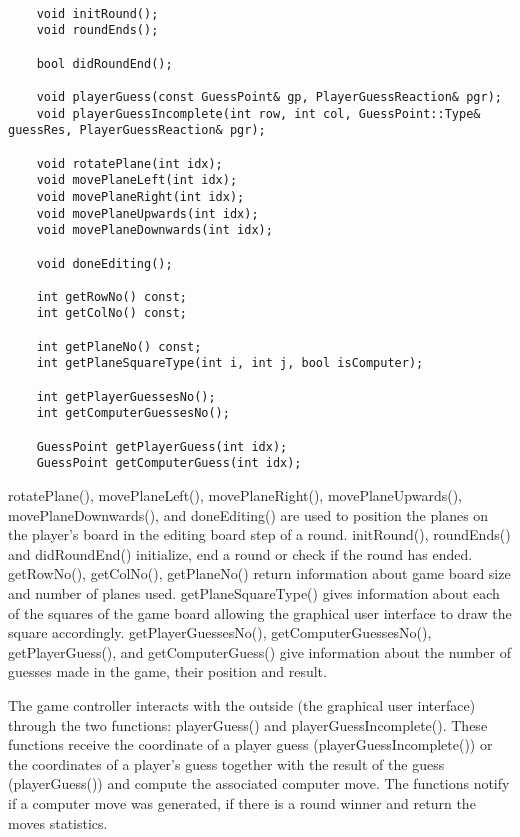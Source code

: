\begin{lstlisting}

	void initRound();
	void roundEnds();
	
	bool didRoundEnd();
	
	void playerGuess(const GuessPoint& gp, PlayerGuessReaction& pgr);
	void playerGuessIncomplete(int row, int col, GuessPoint::Type& guessRes, PlayerGuessReaction& pgr);
	
	void rotatePlane(int idx);
	void movePlaneLeft(int idx);
	void movePlaneRight(int idx);
	void movePlaneUpwards(int idx);
	void movePlaneDownwards(int idx);
	
	void doneEditing();
	
	int getRowNo() const;
	int getColNo() const;
	
	int getPlaneNo() const;
	int getPlaneSquareType(int i, int j, bool isComputer);
	
	int getPlayerGuessesNo();
	int getComputerGuessesNo();
	
	GuessPoint getPlayerGuess(int idx);
	GuessPoint getComputerGuess(int idx);

\end{lstlisting}

rotatePlane(), movePlaneLeft(), movePlaneRight(), movePlaneUpwards(), movePlaneDownwards(), and doneEditing() are used to position the planes on the player's board in the editing board step of a round. initRound(), roundEnds() and didRoundEnd() initialize, end a round or check if the round has ended. getRowNo(), getColNo(), getPlaneNo() return information about game board size and number of planes used. getPlaneSquareType() gives information about each of the squares of the game board allowing the graphical user interface to draw the square accordingly. getPlayerGuessesNo(), getComputerGuessesNo(), getPlayerGuess(), and getComputerGuess() give information about the number of guesses made in the game, their position and result.

The game controller interacts with the outside (the graphical user interface) through the two functions: playerGuess() and playerGuessIncomplete(). These functions receive the coordinate of a player guess (playerGuessIncomplete()) or the coordinates of a player's guess together with the result of the guess (playerGuess()) and compute the associated computer move. The functions notify if a computer move was generated, if there is a round winner and return the moves statistics.

